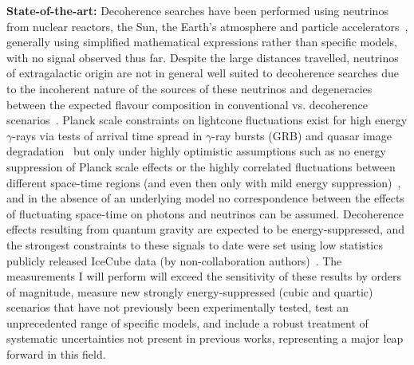 \documentclass[a4paper,11pt]{article}
\begin{document}
\textbf{State-of-the-art:} Decoherence searches have been performed using neutrinos from nuclear reactors, the Sun, the Earth's atmosphere and particle accelerators~\cite{PhysRevLett.85.1166, Abbasi:2009nfa, PhysRevD.89.053002, Bakhti:2015dca, Coelho:2017zes, PhysRevD.95.113005, Coloma:2018idr, de_Holanda_2020}, generally using simplified mathematical expressions rather than specific models, with no signal observed thus far. Despite the large distances travelled, neutrinos of extragalactic origin are not in general well suited to decoherence searches due to the incoherent nature of the sources of these neutrinos and degeneracies between the expected flavour composition in conventional vs. decoherence scenarios~\cite{PhysRevD.102.115003}. Planck scale constraints on lightcone fluctuations exist for high energy $\gamma$-rays via tests of arrival time spread in $\gamma$-ray bursts (GRB) and quasar image degradation~\cite{Perlman_2015} but only under highly optimistic assumptions such as no energy suppression of Planck scale effects or the highly correlated fluctuations between different space-time regions (and even then only with mild energy suppression)~\cite{2103.15313}, and in the absence of an underlying model no correspondence between the effects of fluctuating space-time on photons and neutrinos can be assumed. Decoherence effects resulting from quantum gravity are expected to be energy-suppressed, and the strongest constraints to these signals to date were set using low statistics publicly released IceCube data (by non-collaboration authors)~\cite{Coloma:2018idr}. The measurements I will perform will exceed the sensitivity of these results by orders of magnitude, measure new strongly energy-suppressed (cubic and quartic) scenarios that have not previously been experimentally tested, test an unprecedented range of specific models, and include a robust treatment of systematic uncertainties not present in previous works, representing a major leap forward in this field. \\




\end{document}
